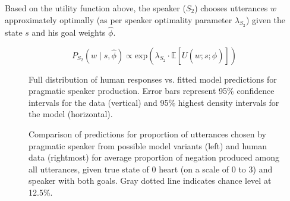 \documentclass[12pt]{article}
\begin{document}
Based on the utility function above, the speaker (\(S_2\)) chooses utterances \(w\) approximately optimally (as per speaker optimality parameter \(\lambda_{S_2}\)) given the state \(s\) and his goal weights \(\hat{\phi}\).

\begin{equation}
P_{S_2}(w \mid s, \hat{\phi}) \propto \mathrm{exp}(\lambda_{S_2} \cdot \mathbb{E}[U(w; s;  \hat{\phi})])
\end{equation}

\begin{figure}
\centering
\caption{\label{fig:variance} Full distribution of human responses vs. fitted model predictions for pragmatic speaker production. Error bars represent 95\% confidence intervals for the data (vertical) and 95\% highest density intervals for the model (horizontal).}
\end{figure}

\begin{figure}
\centering
\caption{\label{fig:uttComp} Comparison of predictions for proportion of utterances chosen by pragmatic speaker from possible model variants (left) and human data (rightmost) for average proportion of negation produced among all utterances, given true state of 0 heart (on a scale of 0 to 3) and speaker with both goals. Gray dotted line indicates chance level at 12.5\%.}
\end{figure}
\end{document}
